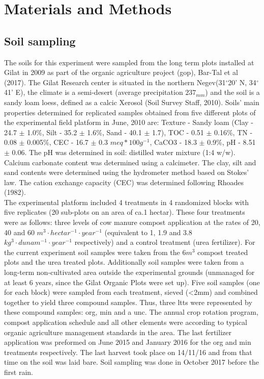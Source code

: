 \documentclass[12pt]{report}
\begin{document}
	\chapter{Materials and Methods}
		
		
		
		\section{Soil sampling}
		The soils for this experiment were sampled from the long term plots installed at Gilat in 2009 as part of the organic agriculture project (\gls{gop}), Bar-Tal et al (2017). The Gilat Research center is situated in the northern Negev(31$^\circ$20' N, 34$^\circ$41' E), the climate is a semi-desert (average precipitation $ 237_{mm} $) and the soil is a sandy loam loess, defined as a calcic Xerosol (Soil Survey Staff, 2010). Soils' main properties determined for replicated samples obtained from five different plots of the experimental field platform in June, 2010 are: Texture - Sandy loam (Clay - 24.7 $\pm$ 1.0\%, Silt - 35.2 $ \pm $ 1.6\%, Sand - 40.1 $\pm$ 1.7), TOC - 0.51 $\pm$ 0.16\%, TN - 0.08 $\pm$ 0.005\%, CEC - 16.7 $\pm$ 0.3 $ meq *
		100g^{-1} $, CaCO3 - 18.3 $\pm$ 0.9\%, pH - 8.51 $\pm$ 0.06. The pH was determined in soil: distilled water mixture (1:4 w/w). Calcium carbonate content was determined using a calcimeter. The clay, silt and sand contents were determined using the hydrometer method based on Stokes’ law. The cation exchange capacity (CEC) was determined following Rhoades (1982).\\
		The experimental platform included 4 treatments in 4 randomized blocks with five replicates (20 sub-plots on an area of ca.1 hectar). These four treatments were as follows: three levels of cow manure compost application at the rates of 20, 40 and 60 $m^3\cdot hectar^{-1}\cdot year^{-1}$ (equivalent to 1, 1.9 and 3.8 $kg^3\cdot dunam^{-1}\cdot year^{-1}$ respectively) and a control treatment (urea fertilizer). For the current experiment soil samples were taken from the 6$m^3$ compost treated plots and the urea treated plots. Additionally soil samples were taken from a long-term non-cultivated area outside the experimental grounds (unmanaged for at least 6 years, since the Gilat Organic Plots were set up).  Five soil samples (one for each block) were sampled from each treatment, sieved (\textless 2mm) and combined together to yield three compound samples. Thus, three \glspl{ltt} were represented by these compound samples: \gls{org}, \gls{min} and a \gls{unc}.
		The annual crop rotation program, compost application schedule and all other elements were according to typical organic agriculture management standards in the area. The last fertilizer application was preformed on June 2015 and January 2016 for the \gls{org} and \gls{min} treatments respectively. The last harvest took place on 14/11/16 and from that time on the soil was laid bare. Soil sampling was done in October 2017 before the first rain.
		
\end{document}
